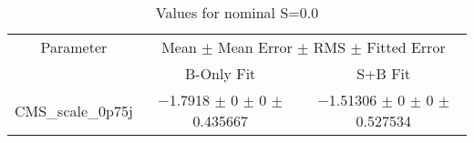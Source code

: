 \begin{table}
\centering
\caption{Values for nominal S=0.0}
\begin{tabular}{ccc}
\toprule
Parameter & \multicolumn{2}{c}{Mean $\pm$ Mean Error $\pm$ RMS $\pm$ Fitted Error}\\
 & B-Only Fit & S+B Fit\\
\midrule
CMS\_scale\_0p75j & \num{-1.7918} $\pm$ \num{0} $\pm$ \num{0} $\pm$ \num{0.435667} & \num{-1.51306} $\pm$ \num{0} $\pm$ \num{0} $\pm$ \num{0.527534}\\
\bottomrule
\end{tabular}
\end{table}